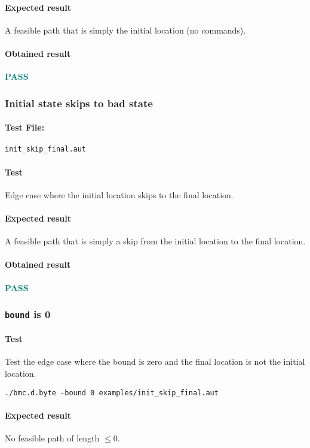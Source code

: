 \documentclass[letterpaper,12pt]{article}
\begin{document}
\paragraph{Expected result}
A feasible path that is simply the initial location (no commands).
\paragraph{Obtained result}
\textbf{\textcolor{teal}{PASS}}


\subsubsection{Initial state skips to bad state}
\paragraph{Test File:} \texttt{init\_skip\_final.aut }
\paragraph{Test}
Edge case where the initial location skips to the final location.
\paragraph{Expected result}
A feasible path that is simply a skip from the initial location to the final location.
\paragraph{Obtained result}
\textbf{\textcolor{teal}{PASS}}

\subsubsection{\texttt{bound} is 0}

\paragraph{Test}
Test the edge case where the bound is zero and the final location is not the initial location.
\begin{verbatim}
./bmc.d.byte -bound 0 examples/init_skip_final.aut 
\end{verbatim}
\paragraph{Expected result}
No feasible path of length $\leq 0$.
\end{document}
